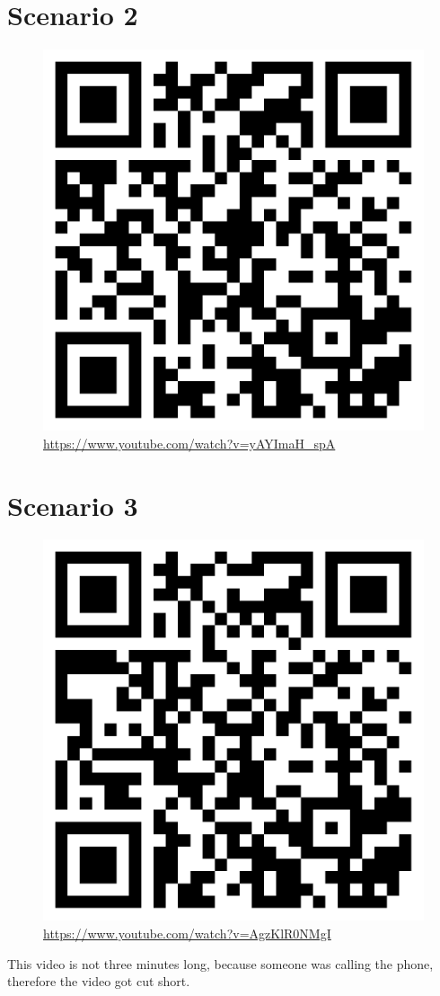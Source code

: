 \section{Scenario 2}
\begin{figure}[h]
\begin{center}
\includegraphics[width=0.8\linewidth]{figs/qr/qrcode2}
\caption*{\href{https://www.youtube.com/watch?v=yAYImaH_spA}{https://www.youtube.com/watch?v=yAYImaH\_spA}}
\end{center}
\end{figure}
\clearpage
\section{Scenario 3}
\begin{figure}[h]
\begin{center}
\includegraphics[width=0.8\linewidth]{figs/qr/qrcode3}
\caption*{\href{https://www.youtube.com/watch?v=AgzKlR0NMgI}{https://www.youtube.com/watch?v=AgzKlR0NMgI}}
\end{center}
\end{figure}
This video is not three minutes long, because someone was calling the phone, therefore the video got cut short.